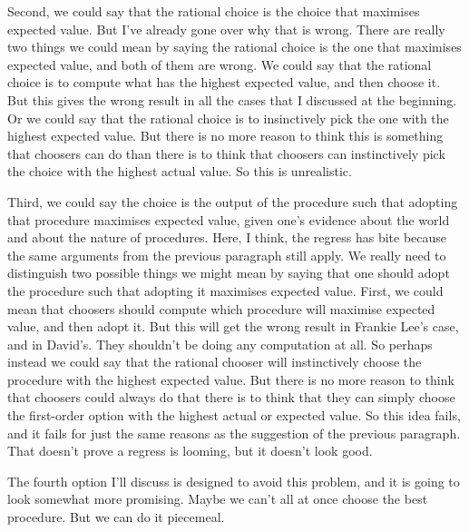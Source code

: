 \documentclass[
  11pt,
  letterpaper,
  DIV=11,
  numbers=noendperiod,
  oneside]{scrartcl}
\begin{document}
Second, we could say that the rational choice is the choice that
maximises expected value. But I've already gone over why that is wrong.
There are really two things we could mean by saying the rational choice
is the one that maximises expected value, and both of them are wrong. We
could say that the rational choice is to compute what has the highest
expected value, and then choose it. But this gives the wrong result in
all the cases that I discussed at the beginning. Or we could say that
the rational choice is to insinctively pick the one with the highest
expected value. But there is no more reason to think this is something
that choosers can do than there is to think that choosers can
instinctively pick the choice with the highest actual value. So this is
unrealistic.

Third, we could say the choice is the output of the procedure such that
adopting that procedure maximises expected value, given one's evidence
about the world and about the nature of procedures. Here, I think, the
regress has bite because the same arguments from the previous paragraph
still apply. We really need to distinguish two possible things we might
mean by saying that one should adopt the procedure such that adopting it
maximises expected value. First, we could mean that choosers should
compute which procedure will maximise expected value, and then adopt it.
But this will get the wrong result in Frankie Lee's case, and in
David's. They shouldn't be doing any computation at all. So perhaps
instead we could say that the rational chooser will instinctively choose
the procedure with the highest expected value. But there is no more
reason to think that choosers could always do that there is to think
that they can simply choose the first-order option with the highest
actual or expected value. So this idea fails, and it fails for just the
same reasons as the suggestion of the previous paragraph. That doesn't
prove a regress is looming, but it doesn't look good.

The fourth option I'll discuss is designed to avoid this problem, and it
is going to look somewhat more promising. Maybe we can't all at once choose the
best procedure. But we can do it piecemeal.
\end{document}
